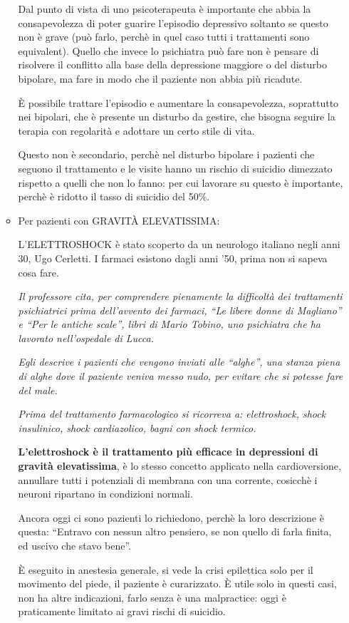 \begin{itemize}
\begin{itemize}
Dal punto di vista di uno psicoterapeuta è importante che abbia la
consapevolezza di poter guarire l'episodio depressivo soltanto se questo
non è grave (può farlo, perchè in quel caso tutti i trattamenti sono
equivalent). Quello che invece lo psichiatra può fare non è pensare di
risolvere il conflitto alla base della depressione maggiore o del
disturbo bipolare, ma fare in modo che il paziente non abbia più
ricadute.

È possibile trattare l'episodio e aumentare la consapevolezza,
soprattutto nei bipolari, che è presente un disturbo da gestire, che
bisogna seguire la terapia con regolarità e adottare un certo stile di
vita.

Questo non è secondario, perchè nel disturbo bipolare i pazienti che
seguono il trattamento e le visite hanno un rischio di suicidio
dimezzato rispetto a quelli che non lo fanno: per cui lavorare su questo
è importante, perchè è ridotto il tasso di suicidio del 50\%.


\item
  Per pazienti con GRAVITÀ ELEVATISSIMA:

L'ELETTROSHOCK è stato scoperto da un neurologo italiano negli anni
  30, Ugo Cerletti. I farmaci esistono dagli anni '50, prima non si
  sapeva cosa fare.

  \emph{Il professore cita, per comprendere pienamente la difficoltà dei
  trattamenti psichiatrici prima dell'avvento dei farmaci, ``Le libere
  donne di Magliano'' e ``Per le antiche scale'', libri di Mario Tobino,
  uno psichiatra che ha lavorato nell'ospedale di Lucca.}

  \emph{Egli descrive i pazienti che vengono inviati alle ``alghe'', una
  stanza piena di alghe dove il paziente veniva messo nudo, per evitare
  che si potesse fare del male.}

  \emph{Prima del trattamento farmacologico si ricorreva a:
  elettroshock, shock insulinico, shock cardiazolico, bagni con shock
  termico.}

  \textbf{L'elettroshock è il trattamento più efficace in depressioni di
  gravità elevatissima}, è lo stesso concetto applicato nella
  cardioversione, annullare tutti i potenziali di membrana con una
  corrente, cosicchè i neuroni ripartano in condizioni normali.

  Ancora oggi ci sono pazienti lo richiedono, perchè la loro descrizione
  è questa: ``Entravo con nessun altro pensiero, se non quello di farla
  finita, ed uscivo che stavo bene''.

  È eseguito in anestesia generale, si vede la crisi epilettica solo per
  il movimento del piede, il paziente è curarizzato. È utile solo in
  questi casi, non ha altre indicazioni, farlo senza è una malpractice:
  oggi è praticamente limitato ai gravi rischi di suicidio.


\end{itemize}
\end{itemize}
